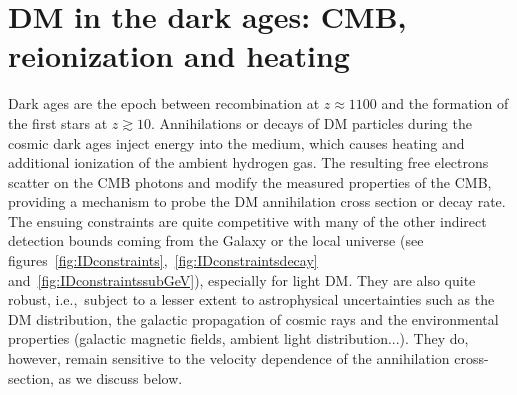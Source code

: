 \section{DM in the dark ages: CMB, reionization and heating}
\label{sec:cosmoconstraints}
Dark ages are the epoch between recombination at $z \approx 1100$ and the formation of the first stars at $z \gtrsim 10$.  Annihilations or decays of DM particles during the cosmic dark ages inject energy into the medium, which causes
 heating and
additional ionization of the ambient hydrogen gas.
The resulting free electrons scatter on the CMB photons and modify the measured properties of the CMB, providing a mechanism 
 to probe the DM annihilation cross section or decay rate. 
The ensuing constraints are quite competitive with many of the other indirect detection bounds coming from the Galaxy or the local universe (see figures~\ref{fig:IDconstraints},~\ref{fig:IDconstraintsdecay} and~\ref{fig:IDconstraintssubGeV}), especially for light DM. 
They are also quite robust, i.e.,\ subject to a lesser extent to astrophysical uncertainties such as the DM distribution, the galactic propagation of cosmic rays and the environmental properties (galactic magnetic fields, ambient light distribution...). 
They do, however, remain sensitive to the velocity dependence of the annihilation cross-section, as we discuss below. 


\medskip

